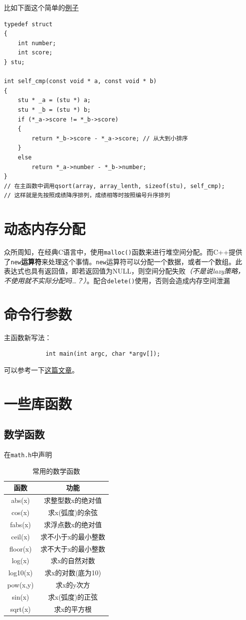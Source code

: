 \documentclass[]{report}
\begin{document}
		比如下面这个简单的\href{https://blog.csdn.net/weixin_45494811/article/details/104471520}{例子}
		\begin{table}
			\centering
			\begin{lstlisting}
typedef struct
{
	int number;
	int score;
} stu;

int self_cmp(const void * a, const void * b)
{
	stu * _a = (stu *) a;
	stu * _b = (stu *) b;
	if (*_a->score != *_b->score)
	{
		return *_b->score - *_a->score; // 从大到小排序
	}
	else
		return *_a->number - *_b->number;
}
// 在主函数中调用qsort(array, array_lenth, sizeof(stu), self_cmp);
// 这样就是先按照成绩降序排列，成绩相等时按照编号升序排列
			\end{lstlisting}
		\end{table}
		\section{动态内存分配}
		众所周知，在经典C语言中，使用\verb|malloc()|函数来进行堆空间分配。而C++提供了\verb|new|\textbf{运算符}来处理这个事情。\verb|new|运算符可以分配一个数据，或者一个数组。此表达式也具有返回值，即若返回值为NULL，则空间分配失败\textsf{\textit{（不是说lazy策略，不使用就不实际分配吗\dots？）}}。配合\verb|delete()|使用，否则会造成内存空间泄漏
	\section{命令行参数}
		主函数新写法：
		\begin{lstlisting}
			int main(int argc, char *argv[]);
		\end{lstlisting}
		可以参考一下\href{https://blog.csdn.net/weixin_43815930/article/details/88558991}{这篇文章}。
	\section{一些库函数}
		\subsection{数学函数}
		在\verb|math.h|中声明
		\begin{table}[h]
			\centering
			\caption{常用的数学函数}
			\begin{tabular}{c|c}
				\toprule
				函数&功能\\
				\midrule
				abs(x)&求整型数x的绝对值\\
				cos(x)&求x(弧度)的余弦\\
				fabs(x)&求浮点数x的绝对值\\
				ceil(x)&求不小于x的最小整数\\
				floor(x)&求不大于x的最小整数\\
				log(x)&求x的自然对数\\
				log10(x)&求x的对数(底为10)\\
				pow(x,y)&求x的y次方\\
				sin(x)&求x(弧度)的正弦\\
				sqrt(x)&求x的平方根\\
				\bottomrule
			\end{tabular}
		\end{table}
\end{document}
